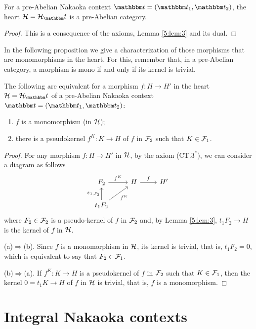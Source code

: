 \begin{thm}\label{5:thm:preabelian}
For a pre-Abelian Nakaoka context $\t=(\t_1,\t_2)$, the heart $\clH=\clH_\t$ is a pre-Abelian category.
\end{thm}
\begin{proof}
This is a consequence of the axioms, Lemma \ref{5:lem:3} and its dual.
\end{proof}

In the following proposition we give a characterization of those morphisms that are monomorphisms in the heart. For this, remember that, in a pre-Abelian category, a morphism is mono if and only if its kernel is trivial.

\begin{prop}\label{prop:1.4}
  The following are equivalent for a morphism $f\colon H\to H'$ in the heart $\clH=\clH_\t$ of a pre-Abelian Nakaoka context $\t=(\t_1,\t_2)$:
  \begin{enumerate}[label=(\alph*)]
    \item $f$ is a monomorphism (in $\mathcal{H}$);
    \item there is a pseudokernel $f^K\colon K\to H$ of $f$ in $\mathcal{F}_2$ such that $K\in \mathcal{F}_1$.
  \end{enumerate}
\end{prop}
\begin{proof}
  For any morphism $f\colon H\to H'$ in $\mathcal{H}$, by the axiom (CT.$3^*$), we can consider a diagram as follows
  \begin{equation*}
    \begin{tikzcd}
      F_2\arrow{r}{f^K} & H\arrow{r}{f} & H'\\
      t_1{F_2}\arrow{u}{\varepsilon_{1,F_2}}\arrow{ur}[']{\tilde{f}^K}
    \end{tikzcd}
  \end{equation*}
  where $F_2\in \mathcal{F}_2$ is a pseudo-kernel of $f$ in $\mathcal{F}_2$ and, by Lemma \ref{5:lem:3}, $t_1F_2\to H$ is the kernel of $f$ in $\mathcal{H}$.

  \smallskip\noindent
  (a)$\Rightarrow$(b). Since $f$ is a monomorphism in $\mathcal{H}$, its kernel is trivial, that is, $t_1F_2=0$, which is equivalent to say that $F_2\in \mathcal{F}_1$.

  \smallskip\noindent
  (b)$\Rightarrow$(a). If  $f^K\colon K\to H$ is a pseudokernel of $f$ in $\mathcal{F}_2$ such that $K\in \mathcal{F}_1$, then the kernel $0=t_1K\to H$ of $f$ in $\mathcal{H}$ is trivial, that is, $f$ is a monomorphism.
\end{proof}

\section{Integral Nakaoka contexts}


